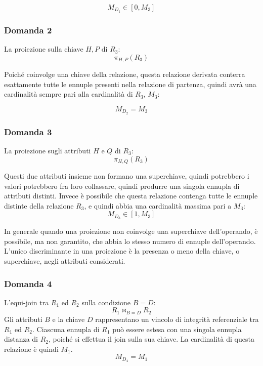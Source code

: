 \documentclass{article}
\numberwithin{equation}{subsection}
\begin{document}
\begin{equation}
    M_{D_1}\in[0,M_3]
\end{equation}

\subsubsection*{Domanda 2}

La proiezione sulla chiave $H,P$ di $R_3$:
\begin{equation*}
    \pi_{H,P}(R_3)
\end{equation*}

Poiché coinvolge una chiave della relazione, questa relazione derivata conterra esattamente tutte le ennuple presenti nella relazione di partenza, quindi avrà una cardinalità sempre pari 
alla cardinalità di $R_3$, $M_3$: 

\begin{equation}
    M_{D_2}=M_3
\end{equation}

\subsubsection*{Domanda 3}

La proiezione sugli attributi $H$ e $Q$ di $R_3$:
\begin{equation*}
    \pi_{H,Q}(R_3)
\end{equation*}

Questi due attributi insieme non formano una superchiave, quindi potrebbero i valori potrebbero fra loro collassare, quindi produrre una singola ennupla di attributi distinti. Invece è 
possibile che questa relazione contenga tutte le ennuple distinte della relazione $R_3$, e quindi abbia una cardinalità massima pari a $M_3$:
\begin{equation}
    M_{D_3}\in[1,M_3]
\end{equation}

In generale quando una proiezione non coinvolge una superchiave dell'operando, è possibile, ma non garantito, che abbia lo stesso numero di ennuple dell'operando. L'unico discriminante in una proiezione è la presenza 
o meno della chiave, o superchiave, negli attributi considerati. 

\subsubsection*{Domanda 4}

L'equi-join tra $R_1$ ed $R_2$ sulla condizione $B=D$:
\begin{equation*}
    R_1\Join_{B=D}R_2
\end{equation*}
Gli attributi $B$ e la chiave $D$ rappresentano un vincolo di integrità referenziale tra $R_1$ ed $R_2$. Ciascuna ennupla di $R_1$ può essere estesa con una singola ennupla distanza di $R_2$, 
poiché si effettua il join sulla sua chiave. La cardinalità di questa relazione è quindi $M_1$.  
\begin{equation}
    M_{D_4}=M_1
\end{equation}
\end{document}
